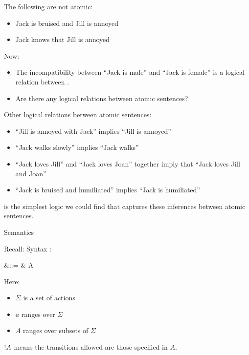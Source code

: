 \begin{frame}
The following are not atomic:
\begin{itemize}
\item
Jack is bruised and Jill is annoyed
\item
Jack knows that Jill is annoyed
\end{itemize}
\end{frame}

\begin{frame}
Now:
\begin{itemize}
\item
The incompatibility between ``Jack is male'' and ``Jack is female'' is a logical relation between .
\item
Are there any  logical relations between atomic sentences?
\end{itemize}
\end{frame}

\begin{frame}
Other logical relations between atomic sentences:
\begin{itemize}
\item
``Jill is annoyed with Jack'' implies ``Jill is annoyed''
\item
``Jack walks slowly'' implies ``Jack walks''
\item
``Jack loves Jill''  and ``Jack loves Joan'' together imply that ``Jack loves Jill and Joan''
\item
``Jack is bruised and humiliated'' implies ``Jack is humiliated''
\end{itemize}
\Cathoristic{} is the simplest logic we could find that captures these inferences between atomic sentences.
\end{frame}

\begin{frame}{Semantics}
\end{frame}

\begin{frame}{Recall: Syntax}
\Cathoristic{}:
\begin{GRAMMAR}
  \phi 
     &\quad ::= \quad & 
  \TRUE 
     \VERTICAL 
  \phi \AND \psi
     \VERTICAL 
     \VERTICAL 
  \fBang A 
\end{GRAMMAR}
Here:
\begin{itemize}
\item
$\Sigma$ is a set of actions
\item
$a$ ranges over  $\Sigma$
\item
$A$ ranges over subsets of  $\Sigma$
\end{itemize}
$! A$ means the  transitions allowed are those specified in $A$.
\end{frame}

